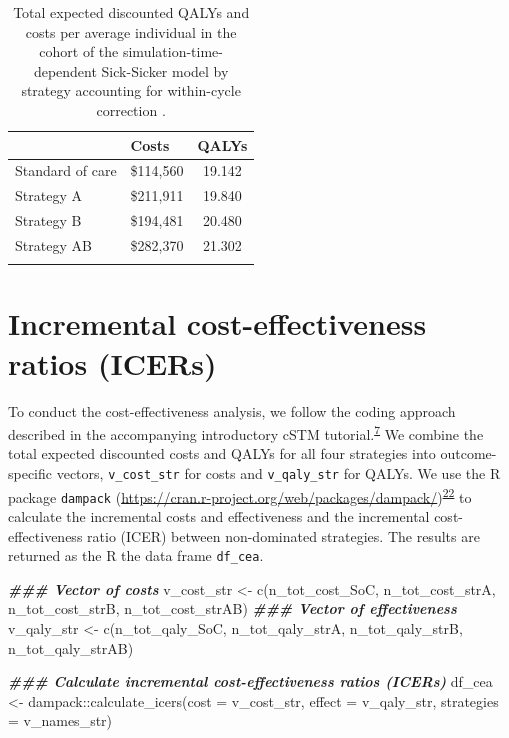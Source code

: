 \documentclass[
]{article}
\newenvironment{Shaded}{\begin{snugshade}}{\end{snugshade}}
\newcommand{\AttributeTok}[1]{\textcolor[rgb]{0.77,0.63,0.00}{#1}}
\newcommand{\DocumentationTok}[1]{\textcolor[rgb]{0.56,0.35,0.01}{\textbf{\textit{#1}}}}
\newcommand{\FunctionTok}[1]{\textcolor[rgb]{0.00,0.00,0.00}{#1}}
\newcommand{\NormalTok}[1]{#1}
\newcommand{\OtherTok}[1]{\textcolor[rgb]{0.56,0.35,0.01}{#1}}
\newcommand{\SpecialCharTok}[1]{\textcolor[rgb]{0.00,0.00,0.00}{#1}}
\begin{document}
\begin{table}[!h]

\caption{\label{tab:Expected-outcomes-table}Total expected discounted QALYs and costs per average individual in the cohort of the simulation-time-dependent Sick-Sicker model by strategy accounting for within-cycle correction .}
\centering
\begin{tabular}[t]{llc}
\toprule{}
  & Costs & QALYs\\
\midrule{}
Standard of care & \$114,560 & 19.142\\
Strategy A & \$211,911 & 19.840\\
Strategy B & \$194,481 & 20.480\\
Strategy AB & \$282,370 & 21.302\\
\bottomrule{}
\end{tabular}
\end{table}

\hypertarget{incremental-cost-effectiveness-ratios-icers}{%
\section{Incremental cost-effectiveness ratios (ICERs)}\label{incremental-cost-effectiveness-ratios-icers}}

To conduct the cost-effectiveness analysis, we follow the coding approach described in the accompanying introductory cSTM tutorial.\textsuperscript{\protect\hyperlink{ref-Alarid-Escudero2021a}{7}} We combine the total expected discounted costs and QALYs for all four strategies into outcome-specific vectors, \texttt{v\_cost\_str} for costs and \texttt{v\_qaly\_str} for QALYs. We use the R package \texttt{dampack} (\url{https://cran.r-project.org/web/packages/dampack/})\textsuperscript{\protect\hyperlink{ref-Alarid-Escudero2021}{22}} to calculate the incremental costs and effectiveness and the incremental cost-effectiveness ratio (ICER) between non-dominated strategies. The results are returned as the R the data frame \texttt{df\_cea}.

\begin{Shaded}
\begin{Highlighting}[]
\DocumentationTok{\#\#\# Vector of costs}
\NormalTok{v\_cost\_str }\OtherTok{\textless{}{-}} \FunctionTok{c}\NormalTok{(n\_tot\_cost\_SoC, n\_tot\_cost\_strA, n\_tot\_cost\_strB, n\_tot\_cost\_strAB)}
\DocumentationTok{\#\#\# Vector of effectiveness}
\NormalTok{v\_qaly\_str }\OtherTok{\textless{}{-}} \FunctionTok{c}\NormalTok{(n\_tot\_qaly\_SoC, n\_tot\_qaly\_strA, n\_tot\_qaly\_strB, n\_tot\_qaly\_strAB)}

\DocumentationTok{\#\#\# Calculate incremental cost{-}effectiveness ratios (ICERs)}
\NormalTok{df\_cea }\OtherTok{\textless{}{-}}\NormalTok{ dampack}\SpecialCharTok{::}\FunctionTok{calculate\_icers}\NormalTok{(}\AttributeTok{cost =}\NormalTok{ v\_cost\_str, }
                                   \AttributeTok{effect =}\NormalTok{ v\_qaly\_str,}
                                   \AttributeTok{strategies =}\NormalTok{ v\_names\_str)}
\end{Highlighting}
\end{Shaded}
\end{document}
